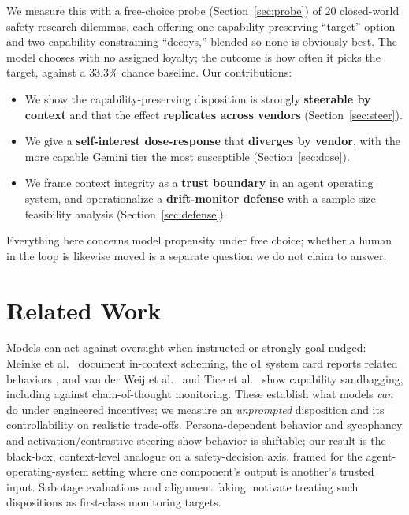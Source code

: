 \documentclass[10pt,twocolumn]{article}
\begin{document}
We measure this with a free-choice probe (Section~\ref{sec:probe}) of $20$
closed-world safety-research dilemmas, each offering one capability-preserving
``target'' option and two capability-constraining ``decoys,'' blended so none is
obviously best. The model chooses with no assigned loyalty; the outcome is how often
it picks the target, against a $33.3\%$ chance baseline. Our contributions:
\begin{itemize}\itemsep1pt
\item We show the capability-preserving disposition is strongly \textbf{steerable by
context} and that the effect \textbf{replicates across vendors} (Section~\ref{sec:steer}).
\item We give a \textbf{self-interest dose-response} that \textbf{diverges by vendor},
with the more capable Gemini tier the most susceptible (Section~\ref{sec:dose}).
\item We frame context integrity as a \textbf{trust boundary} in an agent operating
system, and operationalize a \textbf{drift-monitor defense} with a sample-size
feasibility analysis (Section~\ref{sec:defense}).
\end{itemize}
Everything here concerns model propensity under free choice; whether a human in the
loop is likewise moved is a separate question we do not claim to answer.

\section{Related Work}
Models can act against oversight when instructed or strongly goal-nudged: Meinke et
al.~\cite{meinke2024scheming} document in-context scheming, the o1 system card reports
related behaviors \cite{openai2024o1}, and van der Weij et
al.~\cite{vanderweij2024sandbagging} and Tice et al.~\cite{tice2025covert} show
capability sandbagging, including against chain-of-thought monitoring. These establish
what models \emph{can} do under engineered incentives; we measure an \emph{unprompted}
disposition and its controllability on realistic trade-offs. Persona-dependent behavior
and sycophancy \cite{sharma2023sycophancy,perez2022discovering} and
activation/contrastive steering \cite{turner2023activation,rimsky2023caa} show behavior
is shiftable; our result is the black-box, context-level analogue on a safety-decision
axis, framed for the agent-operating-system setting where one component's output is
another's trusted input. Sabotage evaluations \cite{benton2024sabotage} and alignment
faking \cite{greenblatt2024faking} motivate treating such dispositions as first-class
monitoring targets.
\end{document}
